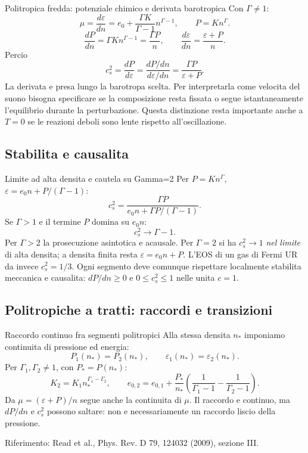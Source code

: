 \begin{frame}[t]{Politropica fredda: potenziale chimico e derivata barotropica}
\vspace*{3mm}
\small
Con $\Gamma\ne1$:
\[
\mu=\frac{d\varepsilon}{dn}=e_0+\frac{\Gamma K}{\Gamma-1}n^{\Gamma-1},
\qquad P=Kn^\Gamma.
\]
\[
\frac{dP}{dn}=\Gamma K n^{\Gamma-1}=\frac{\Gamma P}{n},
\qquad\frac{d\varepsilon}{dn}=\frac{\varepsilon+P}{n}.
\]
Percio
\[
\boxed{c_s^2=\frac{dP}{d\varepsilon}
=\frac{dP/dn}{d\varepsilon/dn}
=\frac{\Gamma P}{\varepsilon+P}.}
\]
La derivata e presa lungo la barotropa scelta. Per interpretarla come
velocita del suono bisogna specificare se la composizione resta fissata
o segue istantaneamente l'equilibrio durante la perturbazione.
\smallskip
Questa distinzione resta importante anche a $T=0$ se le reazioni deboli
sono lente rispetto all'oscillazione.
\end{frame}

\subsection{Stabilita e causalita}

\begin{frame}[t]{Limite ad alta densita e cautela su Gamma=2}
\vspace*{3mm}
\small
Per $P=Kn^\Gamma$, $\varepsilon=e_0n+P/(\Gamma-1)$:
\[
c_s^2=\frac{\Gamma P}{e_0n+\Gamma P/(\Gamma-1)}.
\]
Se $\Gamma>1$ e il termine $P$ domina su $e_0n$:
\[
\boxed{c_s^2\longrightarrow\Gamma-1.}
\]
Per $\Gamma>2$ la prosecuzione asintotica e acausale.
Per $\Gamma=2$ si ha $c_s^2\to1$ \emph{nel limite} di alta densita;
a densita finita resta $\varepsilon=e_0n+P$.
L'EOS di un gas di Fermi UR da invece $c_s^2=1/3$.
\smallskip
Ogni segmento deve comunque rispettare localmente stabilita meccanica
e causalita: $dP/dn\ge0$ e $0\le c_s^2\le1$ nelle unita $c=1$.
\end{frame}

\subsection{Politropiche a tratti: raccordi e transizioni}

\begin{frame}[t]{Raccordo continuo fra segmenti politropici}
\vspace*{3mm}
\small
Alla stessa densita $n_*$ imponiamo continuita di pressione ed energia:
\[
P_1(n_*)=P_2(n_*),\qquad
\varepsilon_1(n_*)=\varepsilon_2(n_*).
\]
Per $\Gamma_1,\Gamma_2\ne1$, con $P_*=P(n_*)$:
\[
K_2=K_1n_*^{\Gamma_1-\Gamma_2},\qquad
e_{0,2}=e_{0,1}+\frac{P_*}{n_*}
\left(\frac1{\Gamma_1-1}-\frac1{\Gamma_2-1}\right).
\]
Da $\mu=(\varepsilon+P)/n$ segue anche la continuita di $\mu$.
\smallskip
Il raccordo e continuo, ma $dP/dn$ e $c_s^2$ possono saltare:
non e necessariamente un raccordo liscio della pressione.
\par\smallskip
{\footnotesize Riferimento: Read et al., Phys. Rev. D 79, 124032 (2009), sezione III.}
\end{frame}

